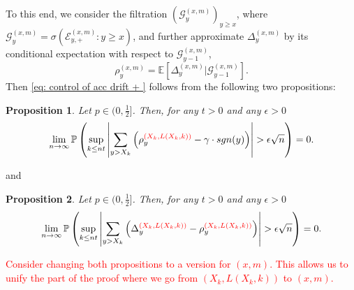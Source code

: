 \documentclass[twoside,12pt,a4paper]{article}
\newtheorem{proposition}{Proposition}[section]
\numberwithin{equation}{section}
\newcommand{\abs}[1]{\left\vert #1 \right\vert}
\newcommand{\edt}[1]{\textcolor{red}{#1}} %
\begin{document}
	To this end, we consider the filtration $\left(\mathcal{G}_{y}^{(x,m)}\right)_{y\geq x}$, where $ \mathcal{G}_{y}^{(x,m)} = \sigma\left( \mathcal{E}^{(x,m)}_{y,+} : y \geq x \right)$, and further approximate $\Delta_y^{(x,m)}$ by its conditional expectation with respect to $\mathcal{G}_{y-1}^{(x,m)}$,
	\begin{equation}\label{eq: conditional mean}
		\rho_{y}^{(x,m)}= \mathbb{E}\left[\Delta_y^{(x,m)} | \mathcal{G}_{y-1}^{(x,m)}\right].
	\end{equation}
	Then \eqref{eq: control of acc drift + } follows from the following two propositions:
	\begin{proposition}\label{lm: approximation of means of local drift}
		Let $p\in (0,\frac{1}{2}]$. Then, for any $t>0$ and any $\epsilon >0$
		\begin{equation}\label{eq: control of expected local drift}
			\lim_{n \to \infty }\mathbb{P}\left(\sup_{k\leq nt} \abs{\sum_{y> X_k} \left( \rho_{y}^{\edt{(X_k,L(X_k,k))}} - \gamma  \cdot sgn(y) \right)   }  > \epsilon \sqrt{n}  \right) =0. 
		\end{equation}
	\end{proposition}
	and
	\begin{proposition}\label{lm: approx local drift by conditional means}
		Let $p\in (0,\frac{1}{2}]$. Then, for any $t>0$ and any $\epsilon >0$
		\begin{equation}\label{eq: control of martingale difference for local drift}
			\lim_{n \to \infty }\mathbb{P}\left(\sup_{k\leq nt} \abs{\sum_{y> X_k} \left(\Delta_{y}^{\edt{(X_k,L(X_k,k))}}- \rho_{y}^{\edt{(X_k,L(X_k,k))}} \right)   }  > \epsilon \sqrt{n}  \right) =0. 
		\end{equation}
	\end{proposition}

	\edt{Consider changing both propositions to a version for $(x,m)$. This allows us to unify the part of the proof where we go from $(X_k, L(X_k, k))$ to $(x,m)$.}
\end{document}
